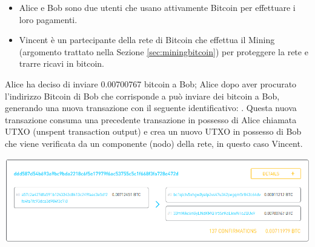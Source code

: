 \begin{itemize}
  \item Alice e Bob sono due utenti che usano attivamente Bitcoin per effettuare i loro pagamenti.
  \item Vincent è un partecipante della rete di Bitcoin che effettua il Mining (argomento trattato nella Sezione \ref{sec:miningbitcoin}) per proteggere la rete e trarre ricavi in bitcoin.
\end{itemize}
Alice ha deciso di inviare 0.00700767 bitcoin a Bob; Alice dopo aver procurato l’indirizzo Bitcoin di Bob che corrisponde a  può inviare dei bitcoin a Bob, generando una nuova transazione con il seguente identificativo: .\newline
Questa nuova transazione consuma una precedente transazione in possesso di Alice chiamata UTXO (unspent transaction output) e crea un nuovo UTXO in possesso di Bob che viene verificata da un componente (nodo) della rete, in questo caso Vincent.

{\centering
\vspace{15pt}
\includegraphics[scale=0.35]{images/example_alice_bob_vincent.png}
\vspace{10pt}
\par}


